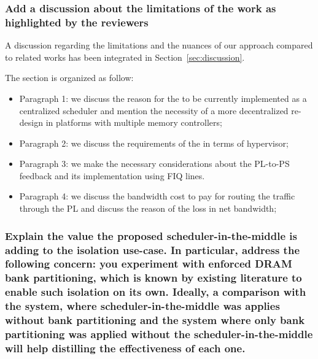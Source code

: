         \subsubsection{Add a discussion about the limitations of the
        work as highlighted by the reviewers}

            A discussion regarding the limitations and the nuances of
            our approach compared to related works has been integrated
            in Section~\ref{sec:discussion}.

            The section is organized as follow:
            \begin{itemize}
                \item Paragraph 1: we discuss the reason for the \schim
                to be currently implemented as a centralized scheduler
                and mention the necessity of a more decentralized
                re-design in platforms with multiple memory
                controllers;

                \item Paragraph 2: we discuss the requirements of the \schim
                in terms of hypervisor;

                \item Paragraph 3: we make the necessary
                considerations about the PL-to-PS feedback and its
                implementation using FIQ lines.

                \item Paragraph 4: we discuss the bandwidth cost to
                pay for routing the traffic through the PL and discuss
                the reason of the loss in net bandwidth;
           \end{itemize}

        \subsubsection{Explain the value the proposed
        scheduler-in-the-middle is adding to the isolation
        use-case. In particular, address the following concern: you
        experiment with enforced DRAM bank partitioning, which is
        known by existing literature to enable such isolation on its
        own. Ideally, a comparison with the system, where
        scheduler-in-the-middle was applies without bank partitioning
        and the system where only bank partitioning was applied
        without the scheduler-in-the-middle will help distilling the
        effectiveness of each one.}

